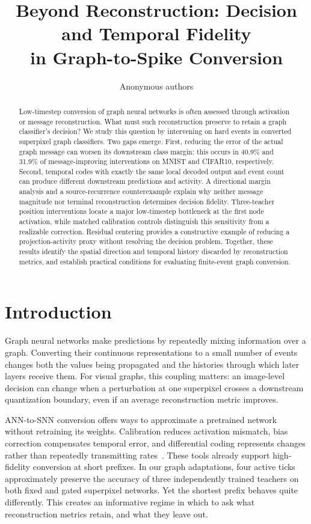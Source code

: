 \documentclass[10pt,twocolumn,letterpaper]{article}
\title{Beyond Reconstruction: Decision and Temporal Fidelity\\in Graph-to-Spike Conversion}
\author{Anonymous authors}
\begin{document}
\maketitle
\begin{abstract}
Low-timestep conversion of graph neural networks is often assessed through activation or message reconstruction. What must such reconstruction preserve to retain a graph classifier's decision? We study this question by intervening on hard events in converted superpixel graph classifiers. Two gaps emerge. First, reducing the error of the actual graph message can worsen its downstream class margin: this occurs in 40.9\% and 31.9\% of message-improving interventions on MNIST and CIFAR10, respectively. Second, temporal codes with exactly the same local decoded output and event count can produce different downstream predictions and activity. A directional margin analysis and a source-recurrence counterexample explain why neither message magnitude nor terminal reconstruction determines decision fidelity. Three-teacher position interventions locate a major low-timestep bottleneck at the first node activation, while matched calibration controls distinguish this sensitivity from a realizable correction. Residual centering provides a constructive example of reducing a projection-activity proxy without resolving the decision problem. Together, these results identify the spatial direction and temporal history discarded by reconstruction metrics, and establish practical conditions for evaluating finite-event graph conversion.
\end{abstract}

\section{Introduction}
Graph neural networks make predictions by repeatedly mixing information over a graph. Converting their continuous representations to a small number of events changes both the values being propagated and the histories through which later layers receive them. For visual graphs, this coupling matters: an image-level decision can change when a perturbation at one superpixel crosses a downstream quantization boundary, even if an average reconstruction metric improves.

ANN-to-SNN conversion offers ways to approximate a pretrained network without retraining its weights. Calibration reduces activation mismatch, bias correction compensates temporal error, and differential coding represents changes rather than repeatedly transmitting rates~\cite{li2021,wu2024ftbc,huang2025}. These tools already support high-fidelity conversion at short prefixes. In our graph adaptations, four active ticks approximately preserve the accuracy of three independently trained teachers on both fixed and gated superpixel networks. Yet the shortest prefix behaves quite differently. This creates an informative regime in which to ask what reconstruction metrics retain, and what they leave out.
\end{document}
